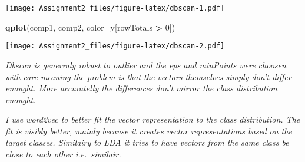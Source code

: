 \documentclass[]{article}
\newenvironment{Shaded}{\begin{snugshade}}{\end{snugshade}}
\newcommand{\DataTypeTok}[1]{\textcolor[rgb]{0.13,0.29,0.53}{#1}}
\newcommand{\DecValTok}[1]{\textcolor[rgb]{0.00,0.00,0.81}{#1}}
\newcommand{\KeywordTok}[1]{\textcolor[rgb]{0.13,0.29,0.53}{\textbf{#1}}}
\newcommand{\NormalTok}[1]{#1}
\newcommand{\OperatorTok}[1]{\textcolor[rgb]{0.81,0.36,0.00}{\textbf{#1}}}
\newcommand{\OtherTok}[1]{\textcolor[rgb]{0.56,0.35,0.01}{#1}}
\newcommand{\StringTok}[1]{\textcolor[rgb]{0.31,0.60,0.02}{#1}}
\begin{document}
\texttt{[image: Assignment2\_files/figure-latex/dbscan-1.pdf]}

\begin{Shaded}
\begin{Highlighting}[]
\KeywordTok{qplot}\NormalTok{(comp1, comp2, }\DataTypeTok{color=}\NormalTok{y[rowTotals }\OperatorTok{>}\StringTok{ }\DecValTok{0}\NormalTok{])}
\end{Highlighting}
\end{Shaded}

\texttt{[image: Assignment2\_files/figure-latex/dbscan-2.pdf]}

\emph{Dbscan is generraly robust to outlier and the eps and minPoints
were choosen with care meaning the problem is that the vectors
themselves simply don't differ enought. More accuratelly the differences
don't mirror the class distribution enought.}

\emph{I use word2vec to better fit the vector representation to the
class distribution. The fit is visibly better, mainly because it creates
vector representations based on the target classes. Similairy to LDA it
tries to have vectors from the same class be close to each other
i.e.~similair.}

\begin{Shaded}
\end{Shaded}
\end{document}
